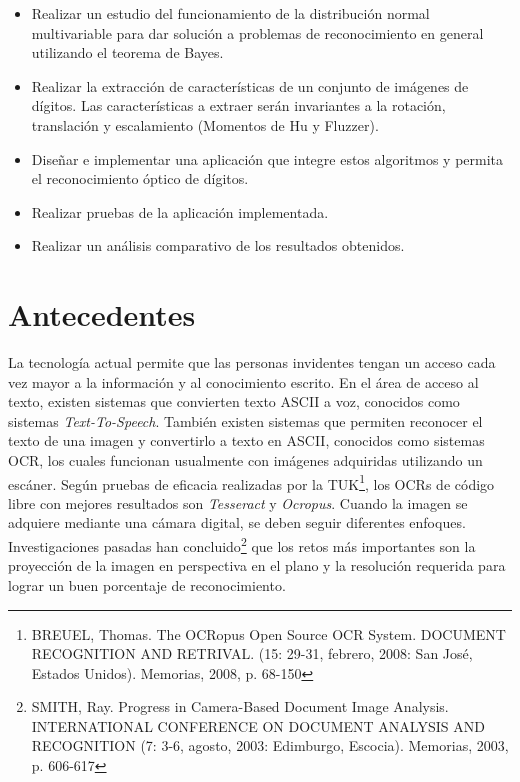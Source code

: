 \documentclass[a4paper, 11pt, oneside]{report}
\begin{document}
	\begin{itemize}
	
	\item Realizar un estudio del funcionamiento de la distribución normal multivariable para dar solución a problemas de reconocimiento en general utilizando el teorema de Bayes.

	\item Realizar la extracción de características de un conjunto de imágenes de dígitos. Las características a extraer serán invariantes a la rotación, translación y escalamiento (Momentos de Hu y Fluzzer).
	
	\item Diseñar e implementar una aplicación que integre estos algoritmos y permita el reconocimiento óptico de dígitos.
	
	\item Realizar pruebas de la aplicación implementada.
	
	\item Realizar un análisis comparativo de los resultados obtenidos.

	\end{itemize}
	
\section {Antecedentes}

La tecnología actual permite que las personas invidentes tengan un acceso cada vez mayor a la información y al conocimiento escrito. En el área de acceso al texto, existen sistemas que convierten texto ASCII a voz, conocidos como sistemas \textit{Text-To-Speech}. También existen sistemas que permiten reconocer el texto de una imagen y convertirlo a texto en ASCII, conocidos como sistemas OCR, los cuales funcionan usualmente con imágenes adquiridas utilizando un escáner. Según pruebas de eficacia realizadas por la TUK\footnote{BREUEL, Thomas. The OCRopus Open Source OCR System. DOCUMENT RECOGNITION AND RETRIVAL. (15: 29-31, febrero, 2008: San José, Estados Unidos). Memorias, 2008, p. 68-150}, los OCRs de código libre con mejores resultados son \textit{Tesseract} y \textit{Ocropus}. Cuando la imagen se adquiere mediante una cámara digital, se deben seguir diferentes enfoques. Investigaciones pasadas han concluido\footnote{SMITH, Ray. Progress in Camera-Based Document Image Analysis. INTERNATIONAL CONFERENCE ON DOCUMENT ANALYSIS AND RECOGNITION (7: 3-6, agosto, 2003: Edimburgo, Escocia). Memorias, 2003, p. 606-617} que los retos más importantes son la proyección de la imagen en perspectiva en el plano y la resolución requerida para lograr un buen porcentaje de reconocimiento.
\end{document}
